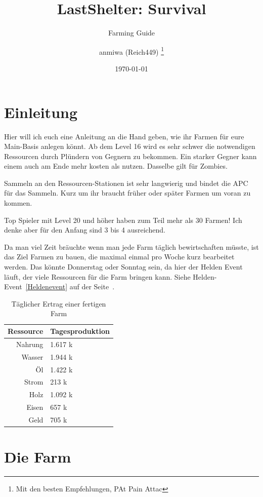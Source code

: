 \documentclass[fontsize=12pt,a4paper]{scrartcl}[2003/01/01]
\title{LastShelter: Survival}
\subtitle{Farming Guide}
\author{\textcopyleft{} anmiwa (Reich449)%
  \thanks{Mit den besten Empfehlungen, PAt Pain Attac}}
\date{\today}               %
\begin{document}
\maketitle                  %
\tableofcontents            %
\listoffigures

\section{Einleitung}
Hier will ich euch eine Anleitung an die Hand geben, wie ihr Farmen für eure Main-Basis anlegen könnt.
Ab dem Level 16 wird es sehr schwer die notwendigen Ressourcen durch Plündern von Gegnern zu bekommen.
Ein starker Gegner kann einem auch am Ende mehr kosten als nutzen. Dasselbe gilt für Zombies.

Sammeln an den Ressourcen-Stationen ist sehr langwierig und bindet die APC für das Sammeln.
Kurz um ihr braucht früher oder später Farmen um voran zu kommen.

Top Spieler mit Level 20 und höher haben zum Teil mehr als 30 Farmen! Ich denke aber für den Anfang sind 3 bis 4 ausreichend.

Da man viel Zeit bräuchte wenn man jede Farm täglich bewirtschaften müsste, ist das Ziel Farmen zu bauen,
die maximal einmal pro Woche kurz bearbeitet werden. Das könnte Donnerstag oder Sonntag sein,
da hier der Helden Event läuft, der viele Ressourcen für die Farm bringen kann.
Siehe Helden-Event~\ref{Heldenevent} auf der Seite~\pageref{Heldenevent}.

\begin{table}[h!]
  \centering
\begin{tabularx}{0.6\textwidth}{rl}
  Ressource & Tagesproduktion \\
  \hline
  Nahrung & 1.617 k \\
  Wasser & 1.944 k \\
  Öl & 1.422 k \\
  Strom & 213 k \\
  Holz & 1.092 k \\
  Eisen & 657 k \\
  Geld & 705 k \\
\end{tabularx}
    \caption[Ertrag]{Täglicher Ertrag einer fertigen Farm}
\end{table}


\section{Die Farm}
\end{document}
